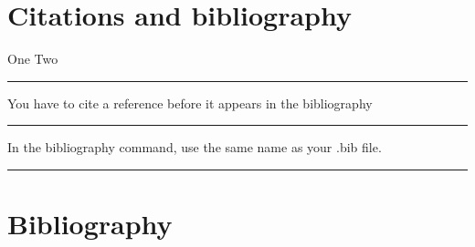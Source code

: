 \documentclass[12pt]{article}
\newcommand{\inOut}[1]{#1} %
\begin{document}
\section{Citations and bibliography}\label{secCit}

\begin{example} \label{expCite1}
\inOut{One \cite{Aa01} Two \cite{LL01}}
\end{example}\hrule

\begin{remark} \label{remCite1}
  You have to cite a reference before it appears in the bibliography
\end{remark}\hrule

\begin{remark} \label{remCite2}
  In the bibliography command, use the same name as your .bib file.
\end{remark}\hrule

\section{Bibliography}\label{secBib}
\newpage

\end{document}
